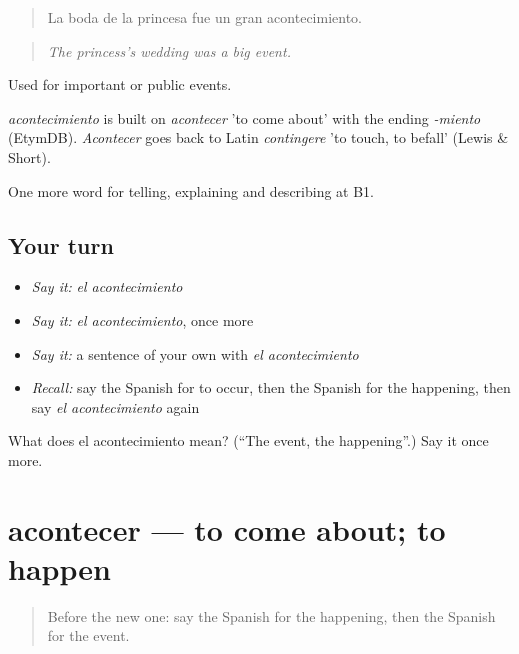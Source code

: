 \begin{quote}
La boda de la princesa fue un gran acontecimiento.
\end{quote}

\begin{quote}
\emph{The princess's wedding was a big event.}
\end{quote}

Used for important or public events.

\begin{cousinweb}
\emph{acontecimiento} is built on \emph{acontecer} 'to come about' with the ending \emph{-miento} (EtymDB). \emph{Acontecer} goes back to Latin \emph{contingere} 'to touch, to befall' (Lewis \& Short).
\end{cousinweb}

\begin{grammarlens}[title={What you've built}]
One more word for telling, explaining and describing at B1.
\end{grammarlens}

\subsection*{Your turn}
\begin{itemize}
\raggedright
  \item \emph{Say it:} \emph{el acontecimiento}
  \item \emph{Say it:} \emph{el acontecimiento}, once more
  \item \emph{Say it:} a sentence of your own with \emph{el acontecimiento}
  \item \emph{Recall:} say the Spanish for to occur, then the Spanish for the happening, then say \emph{el acontecimiento} again
\end{itemize}

\begin{tcolorbox}[breakable,colback=teal!4,colframe=teal!35!black,title={Before you move on}]
What does el acontecimiento mean? (\textquotedblleft{}The event, the happening\textquotedblright{}.) Say it once more.
\end{tcolorbox}
\section[acontecer]{acontecer — to come about; to happen}

\label{lesson:ES-C512-acontecer}



\begin{quote}
Before the new one: say the Spanish for the happening, then the Spanish for the event.
\end{quote}

